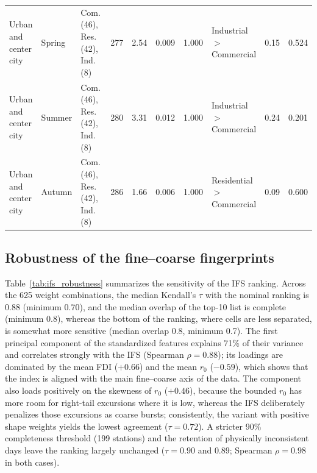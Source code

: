 \documentclass[a4paper,fleqn]{cas-sc}
\begin{document}
\begin{table}[!htbp]
\begin{tabular}{ll>{\raggedright\arraybackslash}p{3.7cm}rrrrlrr}
Urban and center city & Spring & Com.\,(46), Res.\,(42), Ind.\,(8) & 277 & 2.54 & 0.009 & 1.000 & Industrial $>$ Commercial & 0.15 & 0.524 \\
Urban and center city & Summer & Com.\,(46), Res.\,(42), Ind.\,(8) & 280 & 3.31 & 0.012 & 1.000 & Industrial $>$ Commercial & 0.24 & 0.201 \\
Urban and center city & Autumn & Com.\,(46), Res.\,(42), Ind.\,(8) & 286 & 1.66 & 0.006 & 1.000 & Residential $>$ Commercial & 0.09 & 0.600 \\
\bottomrule
\end{tabular}
\end{table}

\subsection{Robustness of the fine--coarse fingerprints}

Table~\ref{tab:ifs_robustness} summarizes the sensitivity of the IFS ranking. Across the 625 weight combinations, the median Kendall's $\tau$ with the nominal ranking is 0.88 (minimum 0.70), and the median overlap of the top-10 list is complete (minimum 0.8), whereas the bottom of the ranking, where cells are less separated, is somewhat more sensitive (median overlap 0.8, minimum 0.7). The first principal component of the standardized features explains 71\% of their variance and correlates strongly with the IFS (Spearman $\rho=0.88$); its loadings are dominated by the mean FDI ($+0.66$) and the mean $r_0$ ($-0.59$), which shows that the index is aligned with the main fine--coarse axis of the data. The component also loads positively on the skewness of $r_0$ ($+0.46$), because the bounded $r_0$ has more room for right-tail excursions where it is low, whereas the IFS deliberately penalizes those excursions as coarse bursts; consistently, the variant with positive shape weights yields the lowest agreement ($\tau=0.72$). A stricter 90\% completeness threshold (199 stations) and the retention of physically inconsistent days leave the ranking largely unchanged ($\tau=0.90$ and $0.89$; Spearman $\rho=0.98$ in both cases).
\end{document}
